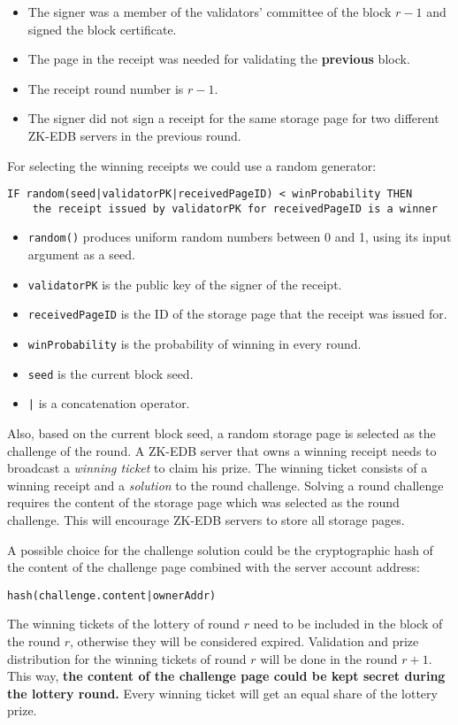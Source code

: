 \begin{itemize}
    \item The signer was a member of the validators' committee of the block $r - 1$ and signed the block certificate.
    \item The page in the receipt was needed for validating the \textbf{previous} block.
    \item The receipt round number is $r - 1$.
    \item The signer did not sign a receipt for the same storage page for two different ZK-EDB servers in
    the previous round.
\end{itemize}
For selecting the winning receipts we could use a random generator:
\begin{verbatim}
IF random(seed|validatorPK|receivedPageID) < winProbability THEN
    the receipt issued by validatorPK for receivedPageID is a winner
\end{verbatim}
\begin{itemize}
    \item \texttt{random()} produces uniform random numbers between 0 and 1, using its input argument as a seed.
    \item \texttt{validatorPK} is the public key of the signer of the receipt.
    \item \texttt{receivedPageID} is the ID of the storage page that the receipt was issued for.
    \item \texttt{winProbability} is the probability of winning in every round.
    \item \texttt{seed} is the current block seed.
    \item \texttt{|} is a concatenation operator.
\end{itemize}

Also, based on the current block seed, a random storage page is
selected as the challenge of the round. A ZK-EDB server that owns a winning receipt needs to broadcast a \emph{winning
ticket} to claim his prize. The winning ticket consists of a winning receipt and a \emph{solution} to the round
challenge. Solving a round challenge requires the content of the storage page which was selected as the round
challenge. This will encourage ZK-EDB servers to store all storage pages.

A possible choice for the challenge solution could be the cryptographic hash of the content of the challenge
page combined with the server account address:

\texttt{hash(challenge.content|ownerAddr)}

The winning tickets of the lottery of round $r$ need to be included in the block of the round $r$,
otherwise they will be considered expired. Validation and prize distribution for the winning tickets of round
$r$ will be done in the round $r + 1$. This way, \textbf{the content of the challenge page could be
kept secret during the lottery round.} Every winning ticket will get an equal share of the lottery prize.
